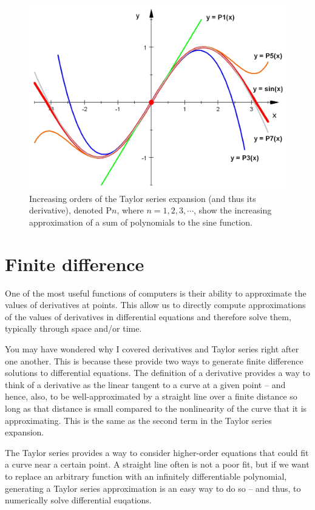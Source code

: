 \documentclass[a4paper,10pt]{scrartcl}
\begin{document}
\begin{figure}[!ht]
\begin{center}
\includegraphics[width=.8\linewidth]{figures/NumericalAndMath/Taylor_Approximation_of_sin(x).jpeg}
\end{center}
\caption{Increasing orders of the Taylor series expansion (and thus its derivative), denoted P$n$, where $n = 1, 2, 3, \cdots$, show the increasing approximation of a sum of polynomials to the sine function.}
\end{figure}

\section{Finite difference}

One of the most useful functions of computers is their ability to approximate the values of derivatives at points. This allow us to directly compute approximations of the values of derivatives in differential equations and therefore solve them, typically through space and/or time.

You may have wondered why I covered derivatives and Taylor series right after one another. This is because these provide two ways to generate finite difference solutions to differential equations. The definition of a derivative provides a way to think of a derivative as the linear tangent to a curve at a given point -- and hence, also, to be well-approximated by a straight line over a finite distance so long as that distance is small compared to the nonlinearity of the curve that it is approximating. This is the same as the second term in the Taylor series expansion.

The Taylor series provides a way to consider higher-order equations that could fit a curve near a certain point. A straight line often is not a poor fit, but if we want to replace an arbitrary function with an infinitely differentiable polynomial, generating a Taylor series approximation is an easy way to do so -- and thus, to numerically solve differential euqations.
\end{document}
